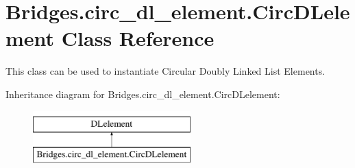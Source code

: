 \hypertarget{class_bridges_1_1circ__dl__element_1_1_circ_d_lelement}{}\section{Bridges.\+circ\+\_\+dl\+\_\+element.\+Circ\+D\+Lelement Class Reference}
\label{class_bridges_1_1circ__dl__element_1_1_circ_d_lelement}


This class can be used to instantiate Circular Doubly Linked List Elements.  


Inheritance diagram for Bridges.\+circ\+\_\+dl\+\_\+element.\+Circ\+D\+Lelement\+:\begin{figure}[H]
\begin{center}
\leavevmode
\includegraphics[height=2.000000cm]{class_bridges_1_1circ__dl__element_1_1_circ_d_lelement}
\end{center}
\end{figure}
